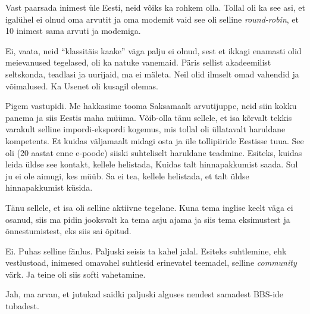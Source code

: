 
Vast paarsada inimest üle Eesti, neid võiks ka  rohkem olla. Tollal oli ka 
see asi, et igalühel ei olnud oma arvutit ja oma modemit vaid see oli selline 
\emph{round-robin}, et 10 inimest sama arvuti ja modemiga. 


Ei, vaata, neid \enquote{klassitäis kaake}  väga palju ei olnud, sest et 
ikkagi enamasti olid meievanused tegelased, oli ka natuke vanemaid. 
Päris sellist akadeemilist seltskonda, 
teadlasi ja uurijaid, ma ei mäleta. Neil olid ilmselt omad vahendid ja 
võimalused. Ka Usenet oli kusagil olemas.


Pigem vastupidi. Me hakkasime tooma Saksamaalt arvutijuppe, neid siin kokku 
panema ja siis Eestis maha müüma. Võib-olla tänu sellele, et isa kõrvalt 
tekkis varakult selline impordi-ekspordi kogemus, mis tollal oli üllatavalt 
haruldane kompetents. Et kuidas väljamaalt midagi osta ja üle tollipiiride 
Eestisse tuua. See oli (20 aastat enne e-poode) siiski  suhteliselt 
haruldane teadmine. Esiteks, kuidas leida üldse see kontakt, kellele helistada, 
Kuidas talt hinnapakkumist saada. Sul ju ei ole aimugi, kes müüb. Sa ei tea, 
kellele helistada, et talt üldse hinnapakkumist küsida. 


Tänu sellele, et isa oli selline aktiivne tegelane. Kuna tema  inglise keelt 
väga ei osanud, siis ma pidin jooksvalt ka tema asju ajama ja siis tema 
eksimustest ja õnnestumistest, eks siis sai õpitud. 


Ei. Puhas selline fänlus. Paljuski seisis ta kahel jalal. Esiteks suhtlemine, 
ehk  vestlustoad, inimesed omavahel suhtlesid erinevatel teemadel, selline 
\emph{community} värk. Ja teine oli siis softi vahetamine.


Jah, ma arvan, et  jutukad saidki paljuski alguses nendest samadest BBS-ide 
tubadest.

